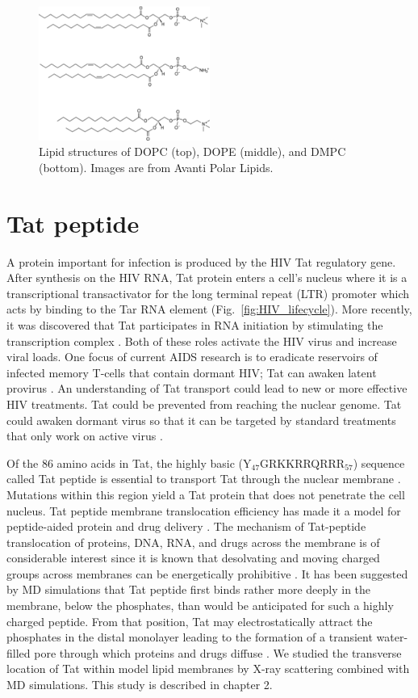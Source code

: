 \begin{figure}[htbp]
  \centering
  \includegraphics[width=0.5\textwidth]{figures/lipid_structure}
  \caption{Lipid structures of DOPC (top), DOPE (middle),
  and DMPC (bottom). Images are from Avanti Polar Lipids.}
  \label{fig:lipid_structure}
\end{figure}

\section{Tat peptide}
A protein important for infection is produced by the HIV Tat regulatory gene.
After synthesis on the HIV RNA, Tat protein enters a cell's nucleus where it is a
transcriptional transactivator for the long terminal repeat (LTR)
promoter which acts by binding to the Tar RNA element \cite{Vaishnav91}
(Fig.~\ref{fig:HIV_lifecycle}).
More recently, it was discovered that Tat participates in RNA
initiation by stimulating the transcription complex \cite{Raha05}.
Both of these roles activate the HIV virus and increase viral loads.
One focus of current AIDS research is to eradicate reservoirs of 
infected memory T-cells that contain dormant HIV;
Tat can awaken latent provirus \cite{Macias09}.
An understanding of Tat transport could lead to new or more effective 
HIV treatments. Tat could be prevented from
reaching the nuclear genome. Tat could awaken dormant virus so that
it can be targeted by standard treatments that only
work on active virus \cite{Macias09}. 

Of the 86 amino acids in Tat,
the highly basic (Y$_{47}$GRKKRRQRRR$_{57}$) sequence called Tat peptide 
is essential to transport
Tat through the nuclear membrane \cite{Ruben89,Hauber87}. 
Mutations within
this region yield a Tat protein that does not penetrate the cell 
nucleus. Tat peptide membrane translocation efficiency 
has made it a model for peptide-aided protein and drug delivery
\cite{Futaki01}. 
The mechanism of Tat-peptide translocation of proteins, 
DNA, RNA, and drugs across the membrane is of considerable interest
since it is known that desolvating and moving charged groups across membranes
can be energetically prohibitive \cite{Grabe04}. 
It has been suggested by MD simulations that Tat peptide first binds rather
more deeply in the membrane, below the phosphates, than
would be anticipated for such a highly charged peptide. From that position,
Tat may electrostatically attract the phosphates in the distal monolayer
leading to the formation of a transient water-filled pore through which
proteins and drugs diffuse \cite{Herce07}. 
We studied the transverse location of Tat within model lipid membranes 
by X-ray scattering
combined with MD simulations. This study is described in chapter 2.

